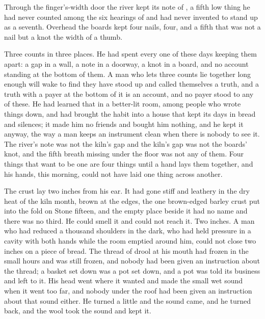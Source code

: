 Through the finger's-width door the river kept its note of , a fifth low thing he had never counted among the six hearings of  and had never invented to stand up as a seventh. Overhead the boards kept four nails, four, and a fifth that was not a nail but a knot the width of a thumb.

Three counts in three places. He had spent every one of these days keeping them apart: a gap in a wall, a note in a doorway, a knot in a board, and no account standing at the bottom of them. A man who lets three counts lie together long enough will wake to find they have stood up and called themselves a truth, and a truth with a payer at the bottom of it is an account, and no payer stood to any of these. He had learned that in a better-lit room, among people who wrote things down, and had brought the habit into a house that kept its days in bread and silences; it made him no friends and bought him nothing, and he kept it anyway, the way a man keeps an instrument clean when there is nobody to see it. The river's note was not the kiln's gap and the kiln's gap was not the boards' knot, and the fifth breath missing under the floor was not any of them. Four things that want to be one are four things until a hand lays them together, and his hands, this morning, could not have laid one thing across another.

The crust lay two inches from his ear. It had gone stiff and leathery in the dry heat of the kiln month, brown at the edges, the one brown-edged barley crust put into the fold on Stone fifteen, and the empty place beside it had no name and there was no third. He could smell it and could not reach it. Two inches. A man who had reduced a thousand shoulders in the dark, who had held pressure in a cavity with both hands while the room emptied around him, could not close two inches on a piece of bread. The thread of drool at his mouth had frozen in the small hours and was still frozen, and nobody had been given an instruction about the thread; a basket set down was a pot set down, and a pot was told its business and left to it. His head went where it wanted and made the small wet sound when it went too far, and nobody under the roof had been given an instruction about that sound either. He turned a little and the sound came, and he turned back, and the wool took the sound and kept it.

